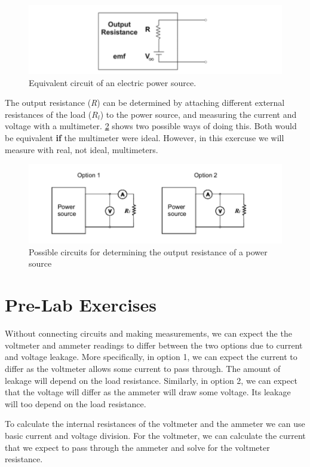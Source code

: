\documentclass{article} %
\begin{document}
\begin{figure}[htbp]            %
  \centering
  \includegraphics[width=0.65\linewidth]{Figs/power_source.png}
  \caption{Equivalent circuit of an electric power source.}
  \label{fig:power_source}
\end{figure}


The output resistance (\textit{R}) can be determined by attaching different external resistances of the load ($R_{l}$) to the power source, and measuring the current and voltage with a multimeter.
\ref{fig:two_circuits} shows two possible ways of doing this. Both would be equivalent \textbf{if} the multimeter were ideal.
However, in this exercuse we will measure with real, not ideal, multimeters.

\begin{figure}[htbp]            %
  \centering
  \includegraphics[width=0.65\linewidth]{Figs/two_circuits.png}
  \caption{Possible circuits for determining the output resistance of a power source}
  \label{fig:two_circuits}
\end{figure}

\section{Pre-Lab Exercises}

Without connecting circuits and making measurements, we can expect the the voltmeter and ammeter readings to differ between the two options due to current and voltage leakage.
More specifically, in option 1, we can expect the current to differ as the voltmeter allows some current to pass through. The amount of leakage will depend on the load resistance.
Similarly, in option 2, we can expect that the voltage will differ as the ammeter will draw some voltage. Its leakage will too depend on the load resistance.

To calculate the internal resistances of the voltmeter and the ammeter we can use basic current and voltage division.
For the voltmeter, we can calculate the current that we expect to pass through the ammeter and solve for the voltmeter resistance.
\end{document}
